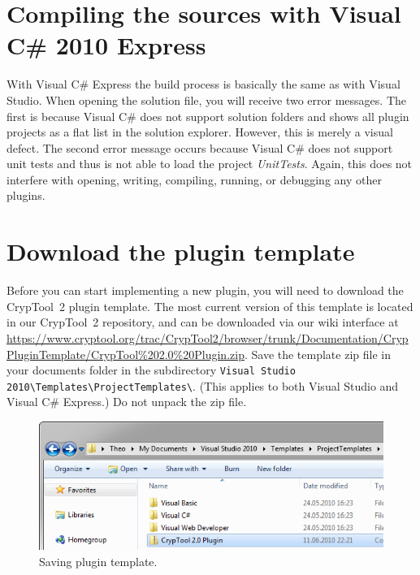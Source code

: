 \section{Compiling the sources with Visual C\# 2010 Express}
\label{CompilingTheSourcesExpress}

With Visual C\# Express the build process is basically the same as with Visual Studio. When opening the solution file, you will receive two error messages. The first is because Visual C\# does not support solution folders and shows all plugin projects as a flat list in the solution explorer. However, this is merely a visual defect. The second error message occurs because Visual C\# does not support unit tests and thus is not able to load the project \textit{UnitTests}. Again, this does not interfere with opening, writing, compiling, running, or debugging any other plugins.

\section{Download the plugin template}
\label{DownloadingThePluginTemplate}

Before you can start implementing a new plugin, you will need to download the CrypTool~2 plugin template. The most current version of this template is located in our CrypTool~2 repository, and can be downloaded via our wiki interface at \url{https://www.cryptool.org/trac/CrypTool2/browser/trunk/Documentation/CrypPluginTemplate/CrypTool\%202.0\%20Plugin.zip}. Save the template zip file in your documents folder in the subdirectory \texttt{Visual Studio 2010\textbackslash{}Templates\textbackslash{}ProjectTemplates\textbackslash{}}. (This applies to both Visual Studio and Visual C\# Express.) Do not unpack the zip file.

\begin{figure}[htbp]
	\centering
		\includegraphics{figures/vs_template.png}
	\caption{Saving plugin template.}
	\label{fig:vs_template}
\end{figure}
\clearpage
